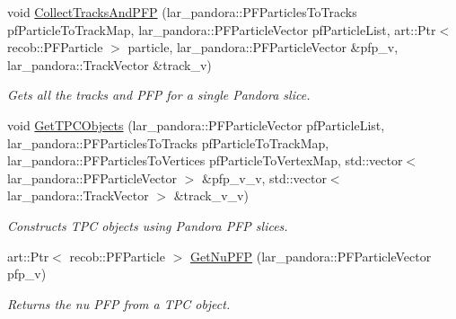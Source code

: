 \begin{DoxyCompactItemize}
\item 
void \hyperlink{classubana_1_1TPCObjectCreator_a6a22be3e596e4bbbc93fc0f10f024d53}{\-Collect\-Tracks\-And\-P\-F\-P} (lar\-\_\-pandora\-::\-P\-F\-Particles\-To\-Tracks pf\-Particle\-To\-Track\-Map, lar\-\_\-pandora\-::\-P\-F\-Particle\-Vector pf\-Particle\-List, art\-::\-Ptr$<$ recob\-::\-P\-F\-Particle $>$ particle, lar\-\_\-pandora\-::\-P\-F\-Particle\-Vector \&pfp\-\_\-v, lar\-\_\-pandora\-::\-Track\-Vector \&track\-\_\-v)
\begin{DoxyCompactList}\small\item\em \-Gets all the tracks and \-P\-F\-P for a single \-Pandora slice. \end{DoxyCompactList}\item 
void \hyperlink{classubana_1_1TPCObjectCreator_ad1291ff6d9af161e7e56bc3cb9fd9135}{\-Get\-T\-P\-C\-Objects} (lar\-\_\-pandora\-::\-P\-F\-Particle\-Vector pf\-Particle\-List, lar\-\_\-pandora\-::\-P\-F\-Particles\-To\-Tracks pf\-Particle\-To\-Track\-Map, lar\-\_\-pandora\-::\-P\-F\-Particles\-To\-Vertices pf\-Particle\-To\-Vertex\-Map, std\-::vector$<$ lar\-\_\-pandora\-::\-P\-F\-Particle\-Vector $>$ \&pfp\-\_\-v\-\_\-v, std\-::vector$<$ lar\-\_\-pandora\-::\-Track\-Vector $>$ \&track\-\_\-v\-\_\-v)
\begin{DoxyCompactList}\small\item\em \-Constructs \-T\-P\-C objects using \-Pandora \-P\-F\-P slices. \end{DoxyCompactList}\item 
art\-::\-Ptr$<$ recob\-::\-P\-F\-Particle $>$ \hyperlink{classubana_1_1TPCObjectCreator_a097bb375d90202d7ff90ddd6b64c007b}{\-Get\-Nu\-P\-F\-P} (lar\-\_\-pandora\-::\-P\-F\-Particle\-Vector pfp\-\_\-v)
\begin{DoxyCompactList}\small\item\em \-Returns the nu \-P\-F\-P from a \-T\-P\-C object. \end{DoxyCompactList}\end{DoxyCompactItemize}


